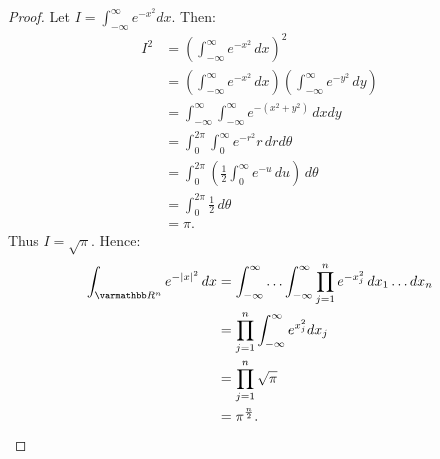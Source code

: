 \documentclass[10pt,oneside,openany]{memoir}
\begin{document}
	\begin{proof}
		Let $I = \int_{-\infty}^{\infty} e^{-x^2}dx$. Then:
		\begin{align*}
			I^2
			&= \left( \int_{-\infty}^{\infty} e^{-x^2}\,dx \right)^2  \\
			&= \left( \int_{-\infty}^{\infty} e^{-x^2}\,dx \right) \left( \int_{-\infty}^{\infty}e^{-y^2}\,dy  \right)   \\
			&= \int_{-\infty}^{\infty} \int_{-\infty}^{\infty} e^{-(x^2+y^2)}\,dxdy \\
			&= \int_{0}^{2\pi} \int_{0}^{\infty} e^{-r^2}r\,drd\theta \\
			&= \int_{0}^{2\pi} \left( \frac{1}{2}\int_{0}^{\infty} e^{-u}\,du \right) \,d\theta \\
			&= \int_{0}^{2\pi} \frac{1}{2}\,d\theta \\
			&= \pi.
		\end{align*}
		Thus $I = \sqrt{\pi}$. Hence:
		\begin{align*}
			\int_{\bfR^n}^{} e^{-|x|^2}\,dx
			&= \int_{-\infty}^{\infty} \ldots\int_{-\infty}^{\infty} \prod_{j=1}^ne^{-x_j^2}\,dx_1\ldots dx_n \\
			&= \prod_{j=1}^n \int_{-\infty}^{\infty} e^{x_j^2}dx_j \\
			&= \prod_{j=1}^n \sqrt{\pi} \\
			&= \pi^{\frac{n}{2}}. \qedhere
		\end{align*}
	\end{proof}
\end{document}
